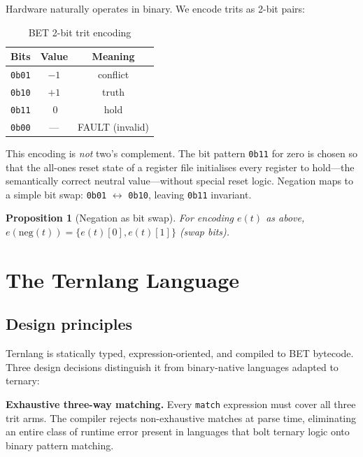 \documentclass[journal,10pt,twocolumn]{IEEEtran}
\newtheorem{proposition}{Proposition}
\begin{document}
Hardware naturally operates in binary. We encode trits as 2-bit pairs:

\begin{table}[h]
\centering
\small
\caption{BET 2-bit trit encoding}
\label{tab:encoding}
\begin{tabular}{ccc}
\toprule
Bits & Value & Meaning \\
\midrule
\texttt{0b01} & $-1$ & conflict \\
\texttt{0b10} & $+1$ & truth \\
\texttt{0b11} & $\ 0$ & hold \\
\texttt{0b00} & --- & FAULT (invalid) \\
\bottomrule
\end{tabular}
\end{table}

This encoding is \emph{not} two's complement. The bit pattern \texttt{0b11}
for zero is chosen so that the all-ones reset state of a register file
initialises every register to hold---the semantically correct neutral
value---without special reset logic. Negation maps to a simple bit swap:
\texttt{0b01} $\leftrightarrow$ \texttt{0b10}, leaving \texttt{0b11}
invariant.

\begin{proposition}[Negation as bit swap]
For encoding $e(t)$ as above, $e(\mathrm{neg}(t)) = \{e(t)[0], e(t)[1]\}$
(swap bits).
\end{proposition}

\section{The Ternlang Language}
\label{sec:language}

\subsection{Design principles}

Ternlang is statically typed, expression-oriented, and compiled to BET
bytecode. Three design decisions distinguish it from binary-native languages
adapted to ternary:

\textbf{Exhaustive three-way matching.} Every \texttt{match} expression must
cover all three trit arms. The compiler rejects non-exhaustive matches at
parse time, eliminating an entire class of runtime error present in languages
that bolt ternary logic onto binary pattern matching.
\end{document}
